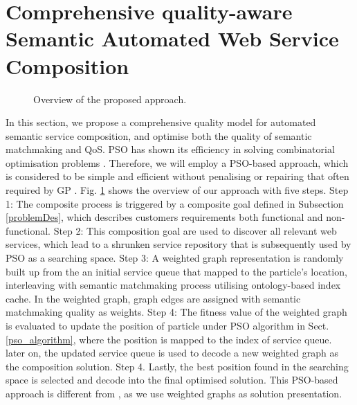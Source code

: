 \documentclass{IEEEtran}
\begin{document}
\section{Comprehensive quality-aware Semantic Automated Web Service Composition}\label{qswsc_approach}

\begin{figure}[h]
\centering
{}
 \caption{Overview of the proposed approach.}
 \label{overview}
\end{figure}

In this section, we propose a comprehensive quality model for automated semantic service composition, and optimise both the quality of semantic matchmaking and QoS. PSO has shown its efficiency in solving combinatorial optimisation problems \cite{fukuyama2008fundamentals}. Therefore, we will employ a PSO-based approach, which is considered to be simple and efficient without penalising or repairing that often required by GP \cite{da2016particle}. Fig. \ref{overview} shows the overview of our approach with five steps. Step 1: The composite process is triggered by a composite goal defined in Subsection \ref{problemDes}, which describes customers requirements both functional and non-functional. Step 2: This composition goal are used to discover all relevant web services, which lead to a shrunken service repository that is subsequently used by PSO as a searching space. Step 3: A weighted graph representation is randomly built up from the an initial service queue that mapped to the particle's location, interleaving with semantic matchmaking process utilising ontology-based index cache. In the weighted graph, graph edges are assigned with semantic matchmaking quality as weights. Step 4: The fitness value of the weighted graph is evaluated to update the position of particle under PSO algorithm in Sect. \ref{pso_algorithm}, where the position is mapped to the index of service queue. later on, the updated service queue is used to decode a new weighted graph as the composition solution. Step 4. Lastly, the best position found in the searching space is selected and decode into the final optimised solution. This PSO-based approach is different from \cite{da2016particle}, as we use weighted graphs as solution presentation.
\end{document}
